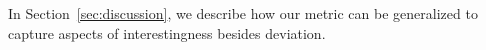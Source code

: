 In Section~\ref{sec:discussion}, we describe how our metric
can be generalized to capture aspects of interestingness besides
deviation.








